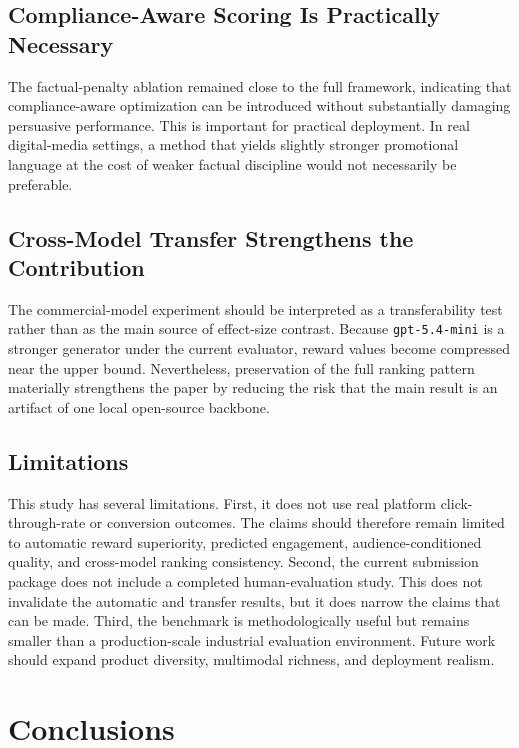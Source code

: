 \documentclass[applsci,article,submit,pdftex,moreauthors]{Definitions/mdpi}
\begin{document}
\subsection{Compliance-Aware Scoring Is Practically Necessary}

The factual-penalty ablation remained close to the full framework, indicating that compliance-aware optimization can be introduced without substantially damaging persuasive performance. This is important for practical deployment. In real digital-media settings, a method that yields slightly stronger promotional language at the cost of weaker factual discipline would not necessarily be preferable.

\subsection{Cross-Model Transfer Strengthens the Contribution}

The commercial-model experiment should be interpreted as a transferability test rather than as the main source of effect-size contrast. Because \texttt{gpt-5.4-mini} is a stronger generator under the current evaluator, reward values become compressed near the upper bound. Nevertheless, preservation of the full ranking pattern materially strengthens the paper by reducing the risk that the main result is an artifact of one local open-source backbone.

\subsection{Limitations}

This study has several limitations. First, it does not use real platform click-through-rate or conversion outcomes. The claims should therefore remain limited to automatic reward superiority, predicted engagement, audience-conditioned quality, and cross-model ranking consistency. Second, the current submission package does not include a completed human-evaluation study. This does not invalidate the automatic and transfer results, but it does narrow the claims that can be made. Third, the benchmark is methodologically useful but remains smaller than a production-scale industrial evaluation environment. Future work should expand product diversity, multimodal richness, and deployment realism.

\section{Conclusions}
\end{document}

